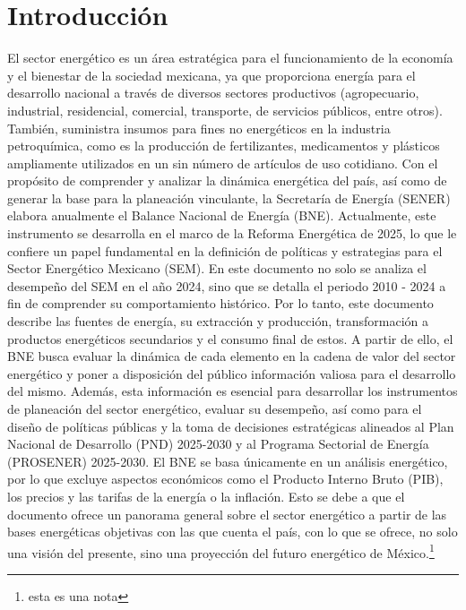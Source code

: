 \documentclass{sener2025}
\begin{document}

\section{Introducción}

El sector energético es un área estratégica para el funcionamiento de la economía y el bienestar de la sociedad mexicana, ya que proporciona energía para el desarrollo nacional a través de diversos sectores productivos (agropecuario, industrial, residencial, comercial, transporte, de servicios públicos, entre otros). También, suministra insumos para fines no energéticos en la industria petroquímica, como es la producción de fertilizantes, medicamentos y plásticos ampliamente utilizados en un sin número de artículos de uso cotidiano.
Con el propósito de comprender y analizar la dinámica energética del país, así como de generar la base para la planeación vinculante, la Secretaría de Energía (SENER) elabora anualmente el Balance Nacional de Energía (BNE). Actualmente, este instrumento se desarrolla en el marco de la Reforma Energética de 2025, lo que le confiere un papel fundamental en la definición de políticas y estrategias para el Sector Energético Mexicano (SEM).
En este documento no solo se analiza el desempeño del SEM en el año 2024, sino que se detalla el periodo 2010 - 2024 a fin de comprender su comportamiento histórico. Por lo tanto, este documento describe las fuentes de energía, su extracción y producción, transformación a productos energéticos secundarios y el consumo final de estos. A partir de ello, el BNE busca evaluar la dinámica de cada elemento en la cadena de valor del sector energético y poner a disposición del público información valiosa para el desarrollo del mismo.
Además, esta información es esencial para desarrollar los instrumentos de planeación del sector energético, evaluar su desempeño, así como para el diseño de políticas públicas y la toma de decisiones estratégicas alineados al Plan Nacional de Desarrollo (PND) 2025-2030 y al Programa Sectorial de Energía (PROSENER) 2025-2030.
El BNE se basa únicamente en un análisis energético, por lo que excluye aspectos económicos como el Producto Interno Bruto (PIB), los precios y las tarifas de la energía o la inflación. Esto se debe a que el documento ofrece un panorama general sobre el sector energético a partir de las bases energéticas objetivas con las que cuenta el país, con lo que se ofrece, no solo una visión del presente, sino una proyección del futuro energético de México.\footnote{esta es una nota}
\end{document}
